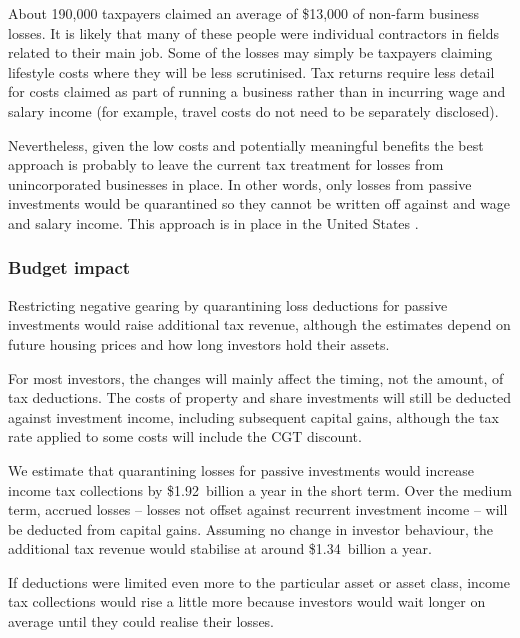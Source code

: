 \documentclass{grattan}\usepackage[]{graphicx}\usepackage[]{color}
\begin{document}
About 190,000 taxpayers claimed an average of \$13,000 of non-farm business losses. It is likely that many of these people were individual contractors in fields related to their main job. Some of the losses may simply be taxpayers claiming lifestyle costs where they will be less scrutinised. Tax returns require less detail for costs claimed as part of running a business rather than in incurring wage and salary income (for example, travel costs do not need to be separately disclosed). 



Nevertheless, given the low costs and potentially meaningful benefits the best approach is probably to leave the current tax treatment for losses from unincorporated businesses in place. In other words, only losses from passive investments would be quarantined so they cannot be written off against and wage and salary income. This approach is in place in the United States . 

\subsubsection{Budget impact}
Restricting negative gearing by quarantining loss deductions for passive investments would raise additional tax revenue, although the estimates depend on future housing prices and how long investors hold their assets. 

For most investors, the changes will mainly affect the timing, not the amount, of tax deductions. The costs of property and share investments will still be deducted against investment income, including subsequent capital gains, although the tax rate applied to some costs will include the CGT discount. 



We estimate that quarantining losses for passive investments would increase income tax collections by \$1.92~billion a year in the short term. Over the medium term, accrued losses -- losses not offset against recurrent investment income -- will be deducted from capital gains. Assuming no change in investor behaviour, the additional tax revenue would stabilise at around \$1.34~billion a year.

If deductions were limited even more to the particular asset or asset class, income tax collections would rise a little more because investors would wait longer on average until they could realise their losses. 
\end{document}
